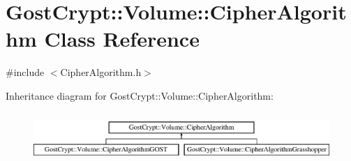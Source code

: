 \hypertarget{class_gost_crypt_1_1_volume_1_1_cipher_algorithm}{}\section{Gost\+Crypt\+:\+:Volume\+:\+:Cipher\+Algorithm Class Reference}
\label{class_gost_crypt_1_1_volume_1_1_cipher_algorithm}


{\ttfamily \#include $<$Cipher\+Algorithm.\+h$>$}

Inheritance diagram for Gost\+Crypt\+:\+:Volume\+:\+:Cipher\+Algorithm\+:\begin{figure}[H]
\begin{center}
\leavevmode
\includegraphics[height=1.904762cm]{class_gost_crypt_1_1_volume_1_1_cipher_algorithm}
\end{center}
\end{figure}
